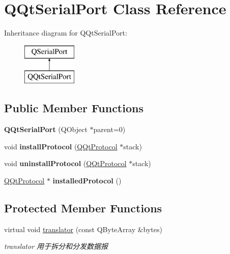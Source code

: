 \hypertarget{class_q_qt_serial_port}{}\section{Q\+Qt\+Serial\+Port Class Reference}
\label{class_q_qt_serial_port}
Inheritance diagram for Q\+Qt\+Serial\+Port\+:\begin{figure}[H]
\begin{center}
\leavevmode
\includegraphics[height=2.000000cm]{class_q_qt_serial_port}
\end{center}
\end{figure}
\subsection*{Public Member Functions}
\begin{DoxyCompactItemize}
\item 
\mbox{\label{class_q_qt_serial_port_a17e8f588637d74cd7b24b4ae7b17c5dd}} 
{\bfseries Q\+Qt\+Serial\+Port} (Q\+Object $\ast$parent=0)
\item 
\mbox{\label{class_q_qt_serial_port_a6d10f970cb2e2e902d5817ba111d3921}} 
void {\bfseries install\+Protocol} (\mbox{\hyperlink{class_q_qt_protocol}{Q\+Qt\+Protocol}} $\ast$stack)
\item 
\mbox{\label{class_q_qt_serial_port_ae424ddaa721a42350cf0285249bfd640}} 
void {\bfseries uninstall\+Protocol} (\mbox{\hyperlink{class_q_qt_protocol}{Q\+Qt\+Protocol}} $\ast$stack)
\item 
\mbox{\label{class_q_qt_serial_port_a878ae6c67b17260934fa861e5d0cc75e}} 
\mbox{\hyperlink{class_q_qt_protocol}{Q\+Qt\+Protocol}} $\ast$ {\bfseries installed\+Protocol} ()
\end{DoxyCompactItemize}
\subsection*{Protected Member Functions}
\begin{DoxyCompactItemize}
\item 
virtual void \mbox{\hyperlink{class_q_qt_serial_port_a7d3e84dbed9a0b874a0a8af849b0a9de}{translator}} (const Q\+Byte\+Array \&bytes)
\begin{DoxyCompactList}\small\item\em translator 用于拆分和分发数据报 \end{DoxyCompactList}\end{DoxyCompactItemize}


